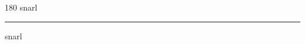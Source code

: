 
\begin{frame}
\begin{center}
\begin{turn}{180}
{\fontsize{2.5cm}{1em}\selectfont snarl}
\end{turn}
\vspace{1em}\par  
\hrule
\vspace{1em}\par  
{\fontsize{2.5cm}{1em}\selectfont snarl}
\end{center}
\end{frame}
